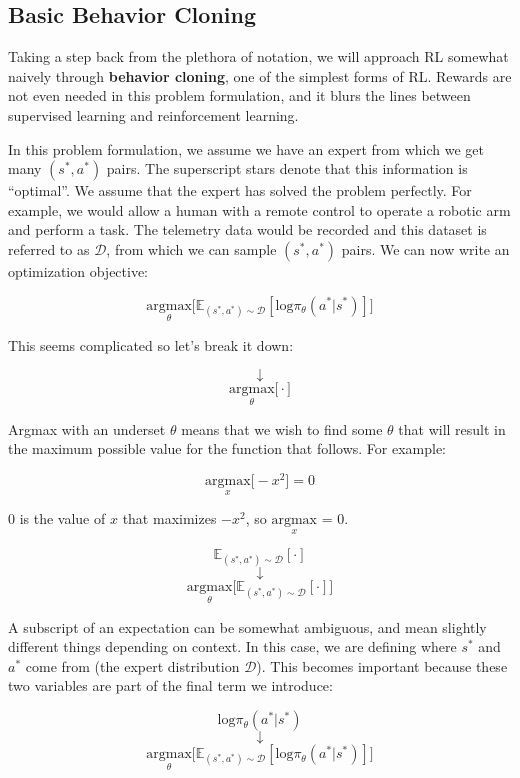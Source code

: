 \subsection{Basic Behavior Cloning}
\begin{flushleft}
    \large Taking a step back from the plethora of notation, we will approach RL somewhat naively through \textbf{behavior cloning}, one of the simplest forms of RL. Rewards are not even needed in this problem formulation, and it blurs the lines between supervised learning and reinforcement learning. \break

    In this problem formulation, we assume we have an expert from which we get many $(s^{*}, a^{*})$ pairs. The superscript stars denote that this information is ``optimal''. We assume that the expert has solved the problem perfectly. For example, we would allow a human with a remote control to operate a robotic arm and perform a task. The telemetry data would be recorded and this dataset is referred to as $\mathcal{D}$, from which we can sample $(s^{*}, a^{*})$ pairs. We can now write an optimization objective:

    $$\underset{\theta}{\textrm{argmax}}\biggl[\mathbb{E}_{(s^{*},a^{*}) \sim \mathcal{D}}[\mathrm{log}\pi_\theta(a^{*}|s^{*})]\biggr]$$

    This seems complicated so let's break it down:

    $$\downarrow$$
    $$\underset{\theta}{\textrm{argmax}}\biggl[ \cdot \biggr]$$

    Argmax with an underset $\theta$ means that we wish to find some $\theta$ that will result in the maximum possible value for the function that follows. For example:

    $$\underset{x}{\textrm{argmax}}\biggl[-x^2\biggr] = 0$$

    0 is the value of $x$ that maximizes $-x^2$, so $\underset{x}{\textrm{argmax}}$ = 0.
    
    $$\mathbb{E}_{(s^{*},a^{*}) \sim \mathcal{D}}[\cdot]$$
    $$\downarrow$$
    $$\underset{\theta}{\textrm{argmax}}\biggl[ \mathbb{E}_{(s^{*},a^{*}) \sim \mathcal{D}}[\cdot] \biggr]$$

   A subscript of an expectation can be somewhat ambiguous, and mean slightly different things depending on context. In this case, we are defining where $s^{*}$ and $a^{*}$ come from (the expert distribution $\mathcal{D}$). This becomes important because these two variables are part of the final term we introduce:

   $$\mathrm{log}\pi_\theta(a^{*}|s^{*})$$
   $$\downarrow$$
   $$\underset{\theta}{\textrm{argmax}}\biggl[\mathbb{E}_{(s^{*},a^{*}) \sim \mathcal{D}}[\mathrm{log}\pi_\theta(a^{*}|s^{*})]\biggr]$$


\end{flushleft}
